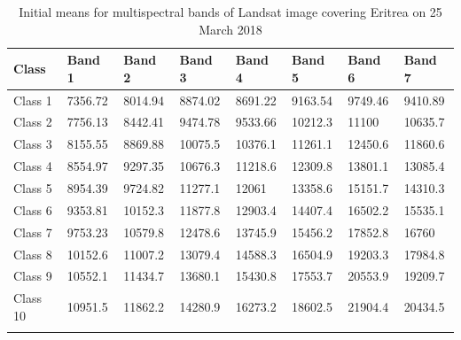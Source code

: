 \documentclass[sn-mathphys-num]{sn-jnl}%
\theoremstyle{thmstyleone}%
\theoremstyle{thmstyletwo}%
\theoremstyle{thmstylethree}%
\begin{document}
\begin{table}[ht]
\caption{Initial means for multispectral bands of Landsat image covering Eritrea on 25 March 2018}
\begin{tabular}{@{}llllllll@{}}
\toprule 
\textbf{Class} & \textbf{Band 1} & \textbf{Band 2} & \textbf{Band 3} & \textbf{Band 4} & \textbf{Band 5} & \textbf{Band 6} & \textbf{Band 7} \\  \midrule
    Class 1 & 7356.72 & 8014.94 & 8874.02 & 8691.22 & 9163.54 & 9749.46 & 9410.89 \\
    Class 2 & 7756.13 & 8442.41 & 9474.78 & 9533.66 & 10212.3 & 11100 & 10635.7 \\
    Class 3 & 8155.55 & 8869.88 & 10075.5 & 10376.1 & 11261.1 & 12450.6 & 11860.6 \\
    Class 4 & 8554.97 & 9297.35 & 10676.3 & 11218.6 &12309.8 & 13801.1 & 13085.4 \\
    Class 5 & 8954.39 & 9724.82 & 11277.1 & 12061 & 13358.6 & 15151.7 &14310.3 \\
    Class 6 & 9353.81 & 10152.3 & 11877.8 & 12903.4 & 14407.4 & 16502.2 & 15535.1 \\
    Class 7 & 9753.23 & 10579.8 & 12478.6 &13745.9 & 15456.2 &17852.8 & 16760 \\
    Class 8 & 10152.6 &11007.2 &13079.4 & 14588.3 & 16504.9 & 19203.3 & 17984.8 \\
    Class 9 & 10552.1 & 11434.7 & 13680.1 & 15430.8 & 17553.7 & 20553.9 & 19209.7 \\
    Class 10 & 10951.5 & 11862.2 & 14280.9 & 16273.2 & 18602.5 & 21904.4 & 20434.5 \\
    \botrule
\end{tabular}
\label{tabA02}
\end{table}
\end{document}
